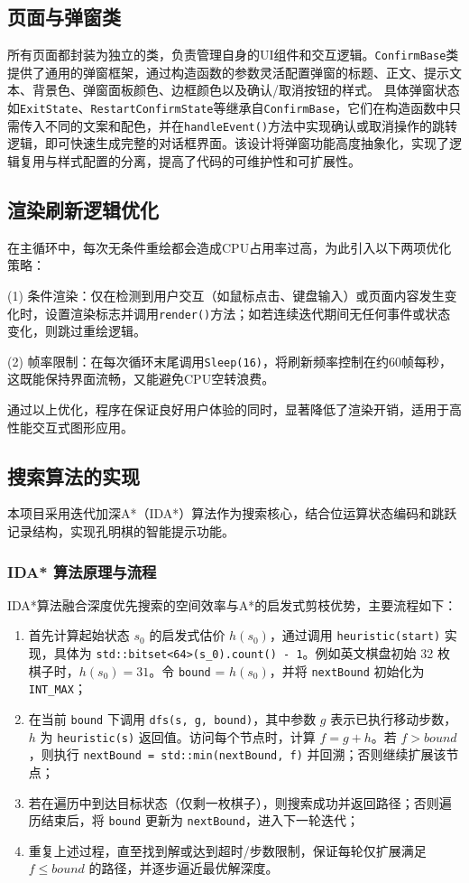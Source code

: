 \documentclass[12pt, a4paper]{article}
\begin{document}
\subsection{页面与弹窗类}
所有页面都封装为独立的类，负责管理自身的UI组件和交互逻辑。\texttt{ConfirmBase}类提供了通用的弹窗框架，通过构造函数的参数灵活配置弹窗的标题、正文、提示文本、背景色、弹窗面板颜色、边框颜色以及确认/取消按钮的样式。
具体弹窗状态如\texttt{ExitState}、\texttt{RestartConfirmState}等继承自\texttt{ConfirmBase}，它们在构造函数中只需传入不同的文案和配色，并在\texttt{handleEvent()}方法中实现确认或取消操作的跳转逻辑，即可快速生成完整的对话框界面。该设计将弹窗功能高度抽象化，实现了逻辑复用与样式配置的分离，提高了代码的可维护性和可扩展性。
\subsection{渲染刷新逻辑优化}
在主循环中，每次无条件重绘都会造成CPU占用率过高，为此引入以下两项优化策略：

(1) 条件渲染：仅在检测到用户交互（如鼠标点击、键盘输入）或页面内容发生变化时，设置渲染标志并调用\texttt{render()}方法；如若连续迭代期间无任何事件或状态变化，则跳过重绘逻辑。

(2) 帧率限制：在每次循环末尾调用\texttt{Sleep(16)}，将刷新频率控制在约60帧每秒，这既能保持界面流畅，又能避免CPU空转浪费。

通过以上优化，程序在保证良好用户体验的同时，显著降低了渲染开销，适用于高性能交互式图形应用。



\subsection{搜索算法的实现}
本项目采用迭代加深A*（IDA*）算法作为搜索核心，结合位运算状态编码和跳跃记录结构，实现孔明棋的智能提示功能。

\subsubsection{IDA* 算法原理与流程}
IDA*算法融合深度优先搜索的空间效率与A*的启发式剪枝优势，主要流程如下：
\begin{enumerate}
  \item 首先计算起始状态 $s_0$ 的启发式估价 $h(s_0)$，通过调用 \texttt{heuristic(start)} 实现，具体为 \texttt{std::bitset<64>(s\_0).count() - 1}。例如英文棋盘初始 32 枚棋子时，$h(s_0)=31$。令 \texttt{bound} = $h(s_0)$，并将 \texttt{nextBound} 初始化为 \texttt{INT\_MAX}；
  \item 在当前 \verb|bound| 下调用 \verb|dfs(s, g, bound)|，其中参数 $g$ 表示已执行移动步数，$h$ 为 \verb|heuristic(s)| 返回值。访问每个节点时，计算 $f = g + h$。若 $f > bound$，则执行 \verb|nextBound = std::min(nextBound, f)| 并回溯；否则继续扩展该节点；
  \item 若在遍历中到达目标状态（仅剩一枚棋子），则搜索成功并返回路径；否则遍历结束后，将 \verb|bound| 更新为 \verb|nextBound|，进入下一轮迭代；
  \item 重复上述过程，直至找到解或达到超时/步数限制，保证每轮仅扩展满足 $f \le bound$ 的路径，并逐步逼近最优解深度。
\end{enumerate}
\end{document}
